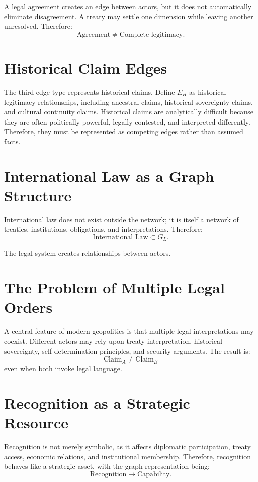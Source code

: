 \documentclass[11pt,openany]{book}
\theoremstyle{plain}
\theoremstyle{definition}
\begin{document}
A legal agreement creates an edge between actors, but it does not automatically eliminate disagreement. A treaty may settle one dimension while leaving another unresolved. Therefore:
\[
\text{Agreement} \neq \text{Complete legitimacy}.
\]

\section*{Historical Claim Edges}

The third edge type represents historical claims. Define \(E_H\) as historical legitimacy relationships, including ancestral claims, historical sovereignty claims, and cultural continuity claims. Historical claims are analytically difficult because they are often politically powerful, legally contested, and interpreted differently. Therefore, they must be represented as competing edges rather than assumed facts.

\section*{International Law as a Graph Structure}

International law does not exist outside the network; it is itself a network of treaties, institutions, obligations, and interpretations. Therefore:
\[
\text{International Law} \subset G_L.
\]

The legal system creates relationships between actors.

\section*{The Problem of Multiple Legal Orders}

A central feature of modern geopolitics is that multiple legal interpretations may coexist. Different actors may rely upon treaty interpretation, historical sovereignty, self-determination principles, and security arguments. The result is:
\[
\text{Claim}_A \neq \text{Claim}_B
\]
even when both invoke legal language.

\section*{Recognition as a Strategic Resource}

Recognition is not merely symbolic, as it affects diplomatic participation, treaty access, economic relations, and institutional membership. Therefore, recognition behaves like a strategic asset, with the graph representation being:
\[
\text{Recognition} \longrightarrow \text{Capability}.
\]
\end{document}
